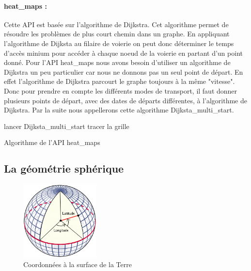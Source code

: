 \documentclass[a4paper]{report}
\begin{document}
\paragraph{heat\_maps :} Cette API est basée sur l'algorithme de Dijkstra. Cet algorithme permet de résoudre les problèmes de plus court chemin dans un graphe. En appliquant l'algorithme de Dijksta au filaire de voierie on peut donc déterminer le temps d'accès minium pour accéder à chaque noeud de la voierie en partant d'un point donné. Pour l'API heat\_maps nous avons besoin d'utiliser un algorithme de Dijkstra un peu particulier car nous ne donnons pas un seul point de départ. En effet l'algorithme de Dijkstra parcourt le graphe toujours à la même "vitesse". Donc pour prendre en compte les différents modes de transport, il faut donner plusieurs points de départ, avec des dates de départs différentes, à l'algorithme de Dijkstra. Par la suite nous appellerons cette algorithme Dijksta\_multi\_start.
\newline

\begin{algorithm}[H]
 lancer Dijksta\_multi\_start \;
 tracer la grille\:
 \caption{Algorithme de l'API heat\_maps}
\end{algorithm}

\subsection{La géométrie sphérique}

\begin{figure}
		\includegraphics[width=4cm]{image/lat_lon}
		\caption{Coordonnées à la surface de la Terre}
		\label{Coordonnées à la surface de la Terre}
\end{figure}
\end{document}
